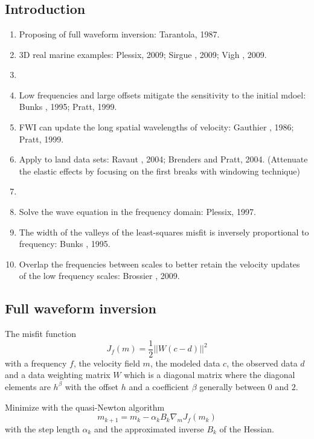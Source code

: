 \renewcommand{\pmk}{Plessix\_2010\_SEG\_Application to land data set}
\renewcommand{\prf}{FWI/\pmk.pdf}
\renewcommand{\pti}{Application of acoustic full waveform inversion
to a low-frequency large-offset land data set}
\renewcommand{\pay}{Ren\'{e}-Edouard Plessix, Guido Baeten and Jan Willem de Maag \etal, 2010}
\renewcommand{\pjo}{SEG 2010 Annual Meeting}
\renewcommand{\pda}{2016/10/3 Mon.}

\section{\pinfo}
\subsection{Introduction}
\begin{enumerate}[\hspace{10mm}*]
  \item Proposing of full waveform inversion: Tarantola, 1987.
  \item 3D real marine examples: Plessix, 2009; Sirgue \etal, 2009; Vigh \etal, 2009.
  \item \sline
  \item Low frequencies and large offsets mitigate the sensitivity to the initial mdoel:
    Bunks \etal, 1995; Pratt, 1999.
  \item FWI can update the long spatial wavelengths of velocity: Gauthier \etal, 1986; Pratt, 1999.
  \item Apply to land data sets: Ravaut \etal, 2004; Brenders and Pratt, 2004.
    (Attenuate the elastic effects by focusing on the first breaks with windowing technique)
  \item \sline
  \item Solve the wave equation in the frequency domain: Plessix, 1997.
  \item The width of the valleys of the least-squares misfit
    is inversely proportional to frequency: Bunks \etal, 1995.
  \item Overlap the frequencies between scales to better retain the velocity updates
    of the low frequency scales: Brossier \etal, 2009.
\end{enumerate}

\subsection{Full waveform inversion}
The misfit function
\[ J_f(m)=\frac{1}{2}||W(c-d)||^2 \]
with a frequency $f$, the velocity field $m$, the modeled data $c$, the observed data $d$
and a data weighting matrix $W$ which is a diagonal matrix where the diagonal elements are $h^\beta$
with the offset $h$ and a coefficient $\beta$ generally between $0$ and $2$.

Minimize with the quasi-Newton algorithm
\[ m_{k+1}=m_k-\alpha_kB_k\nabla_mJ_f(m_k) \]
with the step length $\alpha_k$ and the approximated inverse $B_k$ of the Hessian.

